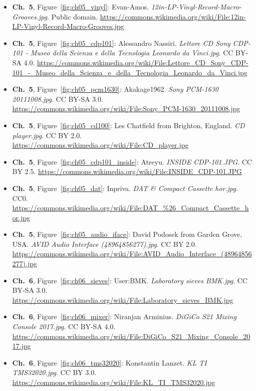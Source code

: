 \begin{small}
\begin{itemize}[leftmargin=0pt,itemsep=2pt,label={}]
\item \textbf{Ch.~5}, Figure~\ref{fig:ch05_vinyl}: Evan-Amos. \emph{12in-\allowbreak{}LP-\allowbreak{}Vinyl-\allowbreak{}Record-\allowbreak{}Macro-\allowbreak{}Grooves.\allowbreak{}jpg}. Public domain. \url{https://commons.wikimedia.org/wiki/File:12in-LP-Vinyl-Record-Macro-Grooves.jpg}
\item \textbf{Ch.~5}, Figure~\ref{fig:ch05_cdp101}: Alessandro Nassiri. \emph{Lettore CD Sony CDP-\allowbreak{}101 -\allowbreak{} Museo della Scienza e della Tecnologia Leonardo da Vinci.\allowbreak{}jpg}. CC BY-SA 4.0. \url{https://commons.wikimedia.org/wiki/File:Lettore_CD_Sony_CDP-101_-_Museo_della_Scienza_e_della_Tecnologia_Leonardo_da_Vinci.jpg}
\item \textbf{Ch.~5}, Figure~\ref{fig:ch05_pcm1630}: Akakage1962. \emph{Sony PCM-\allowbreak{}1630 20111008.\allowbreak{}jpg}. CC BY-SA 3.0. \url{https://commons.wikimedia.org/wiki/File:Sony_PCM-1630_20111008.jpg}
\item \textbf{Ch.~5}, Figure~\ref{fig:ch05_cd100}: Les Chatfield from Brighton, England. \emph{CD player.\allowbreak{}jpg}. CC BY 2.0. \url{https://commons.wikimedia.org/wiki/File:CD_player.jpg}
\item \textbf{Ch.~5}, Figure~\ref{fig:ch05_cdp101_inside}: Atreyu. \emph{INSIDE CDP-\allowbreak{}101.\allowbreak{}JPG}. CC BY 2.5. \url{https://commons.wikimedia.org/wiki/File:INSIDE_CDP-101.JPG}
\item \textbf{Ch.~5}, Figure~\ref{fig:ch05_dat}: Inpriva. \emph{DAT \& Compact Cassette hor.\allowbreak{}jpg}. CC0. \url{https://commons.wikimedia.org/wiki/File:DAT_%26_Compact_Cassette_hor.jpg}
\item \textbf{Ch.~5}, Figure~\ref{fig:ch05_audio_iface}: David Podosek from Garden Grove, USA. \emph{AVID Audio Interface (48964856277).\allowbreak{}jpg}. CC BY 2.0. \url{https://commons.wikimedia.org/wiki/File:AVID_Audio_Interface_(48964856277).jpg}
\item \textbf{Ch.~6}, Figure~\ref{fig:ch06_sieves}: User:BMK. \emph{Laboratory sieves BMK.\allowbreak{}jpg}. CC BY-SA 3.0. \url{https://commons.wikimedia.org/wiki/File:Laboratory_sieves_BMK.jpg}
\item \textbf{Ch.~6}, Figure~\ref{fig:ch06_mixer}: Niranjan Arminius. \emph{DiGiCo S21 Mixing Console 2017.\allowbreak{}jpg}. CC BY-SA 4.0. \url{https://commons.wikimedia.org/wiki/File:DiGiCo_S21_Mixing_Console_2017.jpg}
\item \textbf{Ch.~6}, Figure~\ref{fig:ch06_tms32020}: Konstantin Lanzet. \emph{KL TI TMS32020.\allowbreak{}jpg}. CC BY 3.0. \url{https://commons.wikimedia.org/wiki/File:KL_TI_TMS32020.jpg}

\end{itemize}
\end{small}
